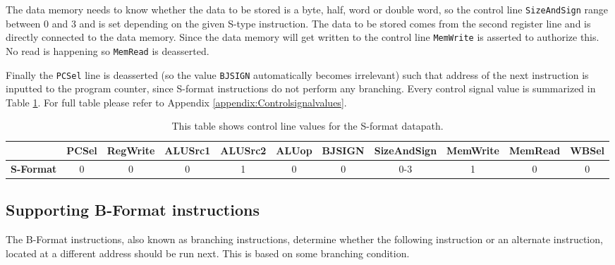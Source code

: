         The data memory needs to know whether the data to be stored is a byte, half, word or double word, so the control line \texttt{SizeAndSign} range between 0 and 3 and is set depending on the given S-type instruction. The data to be stored comes from the second register line and is directly connected to the data memory. Since the data memory will get written to the control line \texttt{MemWrite} is asserted to authorize this. No read is happening so \texttt{MemRead} is deasserted.
        
        Finally the \texttt{PCSel} line is deasserted (so the value \texttt{BJSIGN} automatically becomes irrelevant) such that address of the next instruction is inputted to the program counter, since S-format instructions do not perform any branching. Every control signal value is summarized in Table \ref{table:SFORMAT}. For full table please refer to Appendix \ref{appendix:Controlsignalvalues}.
        
        
        \begin{table}[h!]
            \small
            \hspace{-2.4cm}
            \begin{tabular}{|c||c|c|c|c|c|c|c|c|c|c|}
            	\hline
            	                  & \textbf{PCSel} & \textbf{RegWrite} & \textbf{ALUSrc1} & \textbf{ALUSrc2} & \textbf{ALUop} & \textbf{BJSIGN} & \textbf{SizeAndSign} & \textbf{MemWrite} & \textbf{MemRead} & \textbf{WBSel} \\ \hline\hline
            	\textbf{S-Format} &       0        &         0         &        0         &        1         &       0        &        0        &         0-3          &         1         &        0         &       0        \\ \hline
            \end{tabular}
            \caption{This table shows control line values for the S-format datapath.}
            \label{table:SFORMAT}
        \end{table}
    
    \subsection{Supporting B-Format instructions}
        The B-Format instructions, also known as branching instructions, determine whether the following instruction or an alternate instruction, located at a different address should be run next. This is  based on some branching condition.
        
